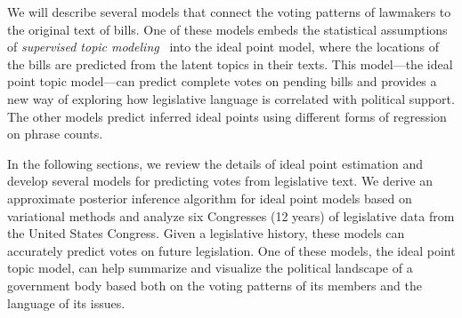 

We will describe several models that connect the voting
patterns of lawmakers to the original text of bills.  One of these
models embeds the statistical assumptions of \textit{supervised topic
  modeling}~\citep{blei:2008} into the ideal point model, where the
locations of the bills are predicted from the latent topics in their
texts. This model---the ideal point topic model---can predict complete
votes on pending bills and provides a new way of exploring how
legislative language is correlated with political support.  The other
models predict inferred ideal points using different forms of
regression on phrase counts.

In the following sections, we review the details of ideal point
estimation and develop several models for predicting votes from
legislative text.  We derive an approximate posterior inference
algorithm for ideal point models based on variational methods and
analyze six Congresses (12 years) of legislative data from the United
States Congress.  Given a legislative history, these models can
accurately predict votes on future legislation.  One of these models,
the ideal point topic model, can help summarize and visualize the
political landscape of a government body based both on the voting
patterns of its members and the language of its issues.

